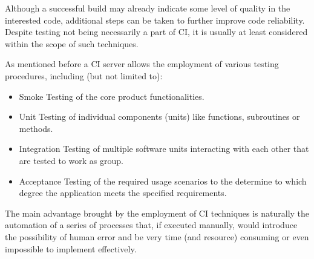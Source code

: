 Although a successful build may already indicate some level of quality in the interested code, additional steps can be taken to further improve code reliability. Despite testing not being necessarily a part of CI, it is usually at least considered within the scope of such techniques. 

As mentioned before a CI server allows the employment of various testing procedures, including (but not limited to):

\begin{itemize}
    \item Smoke Testing of the core product functionalities.
    \item Unit Testing of individual components (units) like functions, subroutines or methods. 
    \item Integration Testing of multiple software units interacting with each other that are tested to work as group.
    \item Acceptance Testing of the required usage scenarios to the determine to which degree the application meets the specified requirements.
\end{itemize}

The main advantage brought by the employment of CI techniques is naturally the automation of a series of processes that, if executed manually, would introduce the possibility of human error and be very time (and resource) consuming or even impossible to implement effectively. 